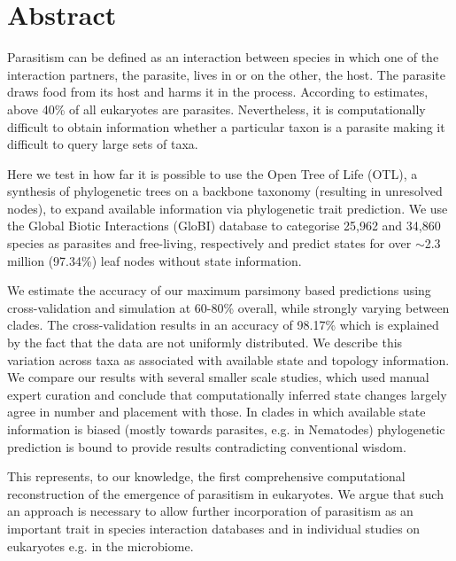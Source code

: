 \chapter*{Abstract}

  Parasitism can be defined as an interaction between species in which one of the interaction 
    partners, the parasite, lives in or on the other, the host. The parasite draws food from its 
    host and harms it in the process. According to estimates, above 40\% of all eukaryotes are 
    parasites. Nevertheless, it is computationally difficult to obtain information whether a 
    particular taxon is a parasite making it difficult to query large sets of taxa.

  Here we test in how far it is possible to use the Open Tree of Life (OTL), a synthesis of 
    phylogenetic trees on a backbone taxonomy (resulting in unresolved nodes), to expand available 
    information via phylogenetic trait prediction. We use the Global Biotic Interactions (GloBI) 
    database to categorise 25,962 and 34,860 species as parasites and free-living, respectively and 
    predict states for over $\sim$2.3 million (97.34\%) leaf nodes without state information.

  We estimate the accuracy of our maximum parsimony based predictions using cross-validation and 
    simulation at 60-80\% overall, while strongly varying between clades. The cross-validation 
    results in an accuracy of 98.17\% which is explained by the fact that the data are not uniformly 
    distributed. We describe this variation across taxa as associated with available state and 
    topology information. We compare our results with several smaller scale studies, which used 
    manual expert curation and conclude that computationally inferred state changes largely agree in 
    number and placement with those. In clades in which available state information is biased 
    (mostly towards parasites, e.g. in Nematodes) phylogenetic prediction is bound to provide 
    results contradicting conventional wisdom.

  This represents, to our knowledge, the first comprehensive computational reconstruction of the 
    emergence of parasitism in eukaryotes. We argue that such an approach is necessary to allow 
    further incorporation of parasitism as an important trait in species interaction databases and 
    in individual studies on eukaryotes e.g. in the microbiome.


